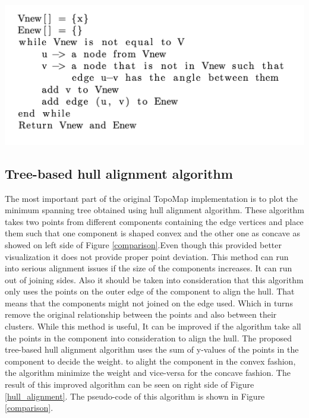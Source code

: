 \documentclass[11pt, a4paper]{article}
\newenvironment{Figure}
  {\par\medskip\noindent\minipage{\linewidth}}
  {\endminipage\par\medskip}
\begin{document}
\begin{multicols}{2}
        \begin{Figure}
            \centering
            \includegraphics[width=\linewidth]{mst.png}
            \label{cos_mst}
        \end{Figure}
        \subsection{Tree-based hull alignment algorithm}
        The most important part of the original TopoMap\cite{harishd} implementation is to plot the minimum spanning tree obtained using hull alignment algorithm. These algorithm takes two points from different components containing the edge vertices and place them such that one component is shaped convex and the other one as concave as showed on left side of Figure \ref*{comparison}.Even though this provided better visualization it does not provide proper point deviation. This method can run into serious alignment issues if the size of the components increases. It can run out of joining sides. Also it should be taken into consideration that this algorithm only uses the points on the outer edge of the component to align the hull. That means that the components might not joined on the edge used. Which in turns remove the original relationship between the points and also between their clusters. While this method is useful, It can be improved if the algorithm take all the points in the component into consideration to align the hull. The proposed tree-based hull alignment algorithm uses the sum of y-values of the points in the component to decide the weight. to alight the component in the convex fashion, the algorithm minimize the weight and vice-versa for the concave fashion. The result of this improved algorithm can be seen on right side of Figure \ref*{hull_alignment}. The pseudo-code of this algorithm is shown in Figure \ref*{comparison}.


\end{multicols}
\end{document}
